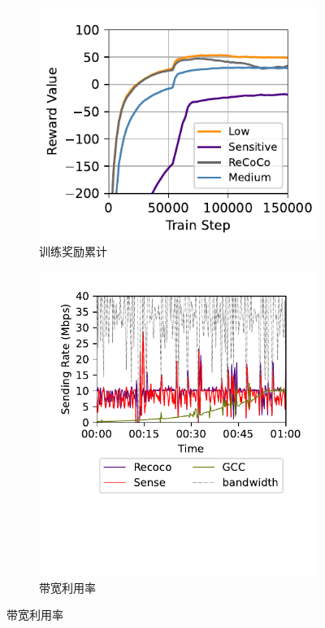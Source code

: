 \begin{figure}[ht]
\centering
\begin{subfigure}[t]{0.4\linewidth}
  \centering
  \includegraphics[width=\linewidth]{figures/chap03/evaluation_plots/reward_value.pdf}
  \caption{训练奖励累计}
  \label{fig-reward-func}
\end{subfigure}%
\hspace{0.02\linewidth} %
\begin{subfigure}[t]{0.4\linewidth}
  \centering
  \includegraphics[width=\linewidth]{figures/chap03/evaluation_plots/bandwidth.pdf}
  \caption{带宽利用率}
  \label{fig-band-util}
\end{subfigure}


\end{figure}
